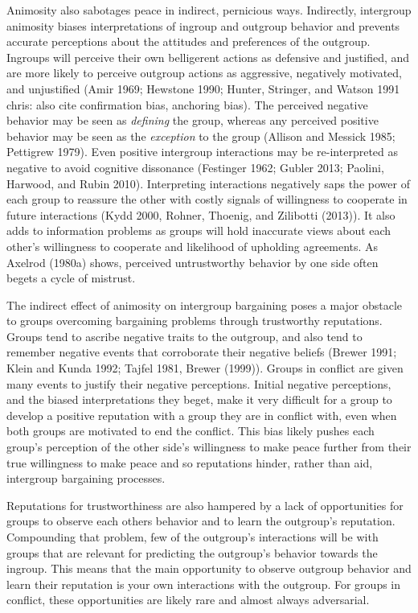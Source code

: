 \documentclass[11pt]{article}
\begin{document}
Animosity also sabotages peace in indirect, pernicious ways. Indirectly,
intergroup animosity biases interpretations of ingroup and outgroup
behavior and prevents accurate perceptions about the attitudes and
preferences of the outgroup. Ingroups will perceive their own
belligerent actions as defensive and justified, and are more likely to
perceive outgroup actions as aggressive, negatively motivated, and
unjustified (Amir 1969; Hewstone 1990; Hunter, Stringer, and Watson 1991
chris: also cite confirmation bias, anchoring bias). The perceived
negative behavior may be seen as \emph{defining} the group, whereas any
perceived positive behavior may be seen as the \emph{exception} to the
group (Allison and Messick 1985; Pettigrew 1979). Even positive
intergroup interactions may be re-interpreted as negative to avoid
cognitive dissonance (Festinger 1962; Gubler 2013; Paolini, Harwood, and
Rubin 2010). Interpreting interactions negatively saps the power of each
group to reassure the other with costly signals of willingness to
cooperate in future interactions (Kydd 2000, Rohner, Thoenig, and
Zilibotti (2013)). It also adds to information problems as groups will
hold inaccurate views about each other's willingness to cooperate and
likelihood of upholding agreements. As Axelrod (1980a) shows, perceived
untrustworthy behavior by one side often begets a cycle of mistrust.

The indirect effect of animosity on intergroup bargaining poses a major
obstacle to groups overcoming bargaining problems through trustworthy
reputations. Groups tend to ascribe negative traits to the outgroup, and
also tend to remember negative events that corroborate their negative
beliefs (Brewer 1991; Klein and Kunda 1992; Tajfel 1981, Brewer (1999)).
Groups in conflict are given many events to justify their negative
perceptions. Initial negative perceptions, and the biased
interpretations they beget, make it very difficult for a group to
develop a positive reputation with a group they are in conflict with,
even when both groups are motivated to end the conflict. This bias
likely pushes each group's perception of the other side's willingness to
make peace further from their true willingness to make peace and so
reputations hinder, rather than aid, intergroup bargaining processes.

Reputations for trustworthiness are also hampered by a lack of
opportunities for groups to observe each others behavior and to learn
the outgroup's reputation. Compounding that problem, few of the
outgroup's interactions will be with groups that are relevant for
predicting the outgroup's behavior towards the ingroup. This means that
the main opportunity to observe outgroup behavior and learn their
reputation is your own interactions with the outgroup. For groups in
conflict, these opportunities are likely rare and almost always
adversarial.
\end{document}
